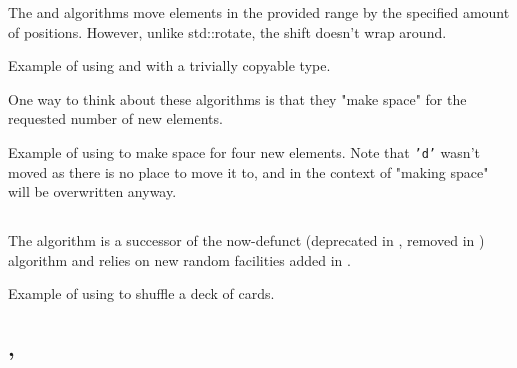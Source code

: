 The  and  algorithms move elements in the provided range by the specified amount of positions.
However, unlike std::rotate, the shift doesn't wrap around.


\begin{codebox}[]{\href{https://compiler-explorer.com/z/5Tjh3M5Kv}{\ExternalLink}}
\footnotesize Example of using  and  with a trivially copyable type.
\tcblower
{}
\end{codebox}

One way to think about these algorithms is that they "make space" for the requested number of new elements.

\begin{codebox}[breakable]{\href{https://compiler-explorer.com/z/sbY3fxYrs}{\ExternalLink}}
\footnotesize Example of using  to make space for four new elements. Note that \texttt{'d'} wasn't moved as there is no place to move it to, and in the context of "making space" will be overwritten anyway.
\tcblower
{}
\end{codebox}

\subsection{\texorpdfstring{}{\texttt{std::shuffle}}}

The  algorithm is a successor of the now-defunct (deprecated in , removed in )  algorithm and relies on new random facilities added in .


\begin{codebox}[breakable]{\href{https://compiler-explorer.com/z/PE3bM8Gof}{\ExternalLink}}
\footnotesize Example of using  to shuffle a deck of cards.
\tcblower
{}
\end{codebox}

\subsection{\texorpdfstring{, }{\texttt{std::next\_permutation}, \texttt{std::prev\_permutation}}}

